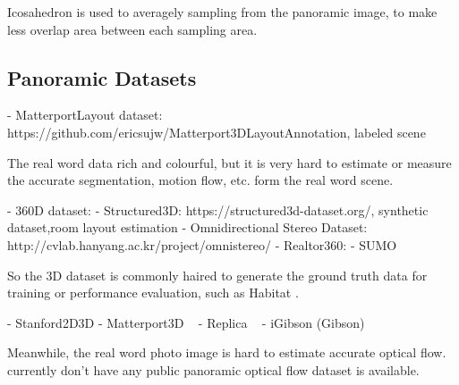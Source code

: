 \citet{EderPVBF2019}
\citet{EderSLF2020}
Icosahedron is used to averagely sampling from the panoramic image, to make less overlap area between each sampling area.
\citet{LuoZSX2019}
\citet{ZhangLSC2019}
\citet{LeeJYJY2019}

\citet{GkitsZAZD2020}
\citet{SuG2019}
\citet{CohenGKW2018}
\citet{JiangHKPMN2019}

\subsection{Panoramic Datasets}

- MatterportLayout dataset: https://github.com/ericsujw/Matterport3DLayoutAnnotation, labeled scene

The real word data rich and colourful, but it is very hard to estimate or measure the accurate segmentation, motion flow, etc. form the real word scene.

- 360D dataset:
- Structured3D: https://structured3d-dataset.org/, synthetic dataset,room layout estimation
- Omnidirectional Stereo Dataset: http://cvlab.hanyang.ac.kr/project/omnistereo/
- Realtor360: 
- SUMO

So the 3D dataset is commonly haired to generate the ground truth data for training or performance evaluation, such as Habitat \cite{SavvaKMZWJSLKMPB2019}.

- Stanford2D3D \cite{ArmenSZS2017}
- Matterport3D ~\cite{ChangDFHNSSZZ2017}
- Replica ~\cite{StrauWMCWGEMRVCYBYPYZLCBGMPSBSNGLN2019}
- iGibson (Gibson)


Meanwhile, the real word photo image is hard to estimate accurate optical flow.
 currently don't have any public panoramic optical flow dataset is available.
